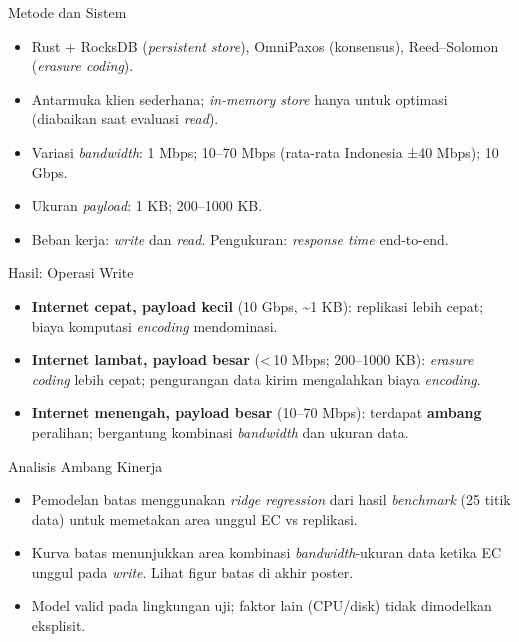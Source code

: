 \documentclass[a2,portrait]{config/poster/a0poster}
\newcommand{\postersection}[1]{%
	\begin{tcolorbox}[
		colback=MainBlue,
		colframe=MainBlue,
		fonttitle=\bfseries,
		coltext=white,
		sharp corners,
		boxrule=0pt,
		top=0pt,
		bottom=0pt,
		halign=center
	]
	\normalsize #1
	\end{tcolorbox}%
}
\begin{document}
\begin{multicols}{2}

\postersection{Metode dan Sistem}
\begin{itemize}
	\item Rust + RocksDB (\textit{persistent store}), OmniPaxos (konsensus), Reed–Solomon (\textit{erasure coding}).
	\item Antarmuka klien sederhana; \textit{in-memory store} hanya untuk optimasi (diabaikan saat evaluasi \textit{read}).
\end{itemize}
\begin{itemize}
	\item Variasi \textit{bandwidth}: 1 Mbps; 10–70 Mbps (rata-rata Indonesia ±40 Mbps); 10 Gbps.
	\item Ukuran \textit{payload}: 1 KB; 200–1000 KB.
	\item Beban kerja: \textit{write} dan \textit{read}. Pengukuran: \textit{response time} end-to-end.
\end{itemize}


\postersection{Hasil: Operasi Write}
\begin{itemize}
	\item \textbf{Internet cepat, payload kecil} (10 Gbps, \textasciitilde1 KB): replikasi lebih cepat; biaya komputasi \textit{encoding} mendominasi.
	\item \textbf{Internet lambat, payload besar} (\textless{}\,10 Mbps; 200–1000 KB): \textit{erasure coding} lebih cepat; pengurangan data kirim mengalahkan biaya \textit{encoding}.
	\item \textbf{Internet menengah, payload besar} (10–70 Mbps): terdapat \textbf{ambang} peralihan; bergantung kombinasi \textit{bandwidth} dan ukuran data.
\end{itemize}


\postersection{Analisis Ambang Kinerja}
\begin{itemize}
	\item Pemodelan batas menggunakan \textit{ridge regression} dari hasil \textit{benchmark} (25 titik data) untuk memetakan area unggul EC vs replikasi.
	\item Kurva batas menunjukkan area kombinasi \textit{bandwidth}-ukuran data ketika EC unggul pada \textit{write}. Lihat figur batas di akhir poster.
	\item Model valid pada lingkungan uji; faktor lain (CPU/disk) tidak dimodelkan eksplisit.
\end{itemize}


\end{multicols}
\end{document}
